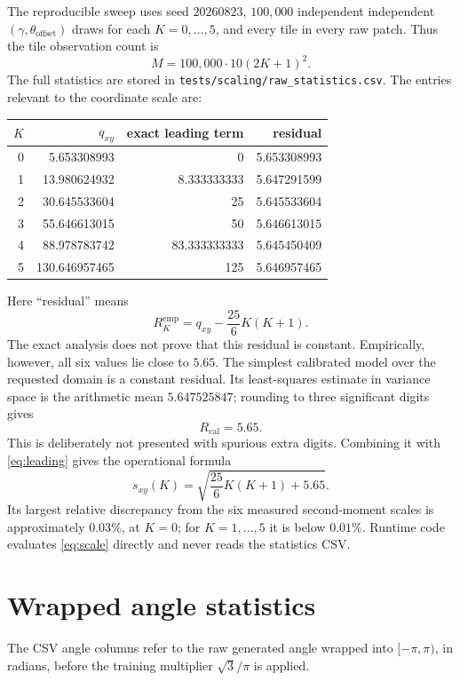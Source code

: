 \documentclass[11pt]{article}
\begin{document}
The reproducible sweep uses seed \(20260823\), \(100{,}000\) independent
independent \((\gamma,\theta_{\mathrm{offset}})\) draws for each
\(K=0,\ldots,5\), and every tile in every raw
patch.
Thus the tile observation count is
\[
  M=100{,}000\cdot10(2K+1)^2.
\]
The full statistics are stored in
\texttt{tests/scaling/raw\_statistics.csv}.  The entries relevant to the
coordinate scale are:
\begin{center}
\begin{tabular}{rrrr}
\(K\)&\(q_{xy}\)&exact leading term&residual\\
\hline
0&5.653308993&0&5.653308993\\
1&13.980624932&8.333333333&5.647291599\\
2&30.645533604&25&5.645533604\\
3&55.646613015&50&5.646613015\\
4&88.978783742&83.333333333&5.645450409\\
5&130.646957465&125&5.646957465
\end{tabular}
\end{center}
Here ``residual'' means
\[
  R_K^{\mathrm{emp}}
  =
  q_{xy}-
  \frac{25}{6}K(K+1).
\]
The exact analysis does not prove that this residual is constant.  Empirically,
however, all six values lie close to \(5.65\).  The simplest calibrated model
over the requested domain is a constant residual.  Its least-squares estimate
in variance space is the arithmetic mean \(5.647525847\); rounding to three
significant digits gives
\[
  R_{\mathrm{cal}}=5.65.
\]
This is deliberately not presented with spurious extra digits.  Combining it
with \eqref{eq:leading} gives the operational formula
\begin{equation}
  \boxed{
  s_{xy}(K)
  =
  \sqrt{\frac{25}{6}K(K+1)+5.65}
  }.
  \label{eq:scale}
\end{equation}
Its largest relative discrepancy from the six measured second-moment scales
is approximately \(0.03\%\), at \(K=0\); for
\(K=1,\ldots,5\) it is below \(0.01\%\).  Runtime code evaluates
\eqref{eq:scale} directly and never reads the statistics CSV.

\section{Wrapped angle statistics}

The CSV angle columns refer to the raw generated angle wrapped into
\([-\pi,\pi)\), in radians, before the training multiplier
\(\sqrt3/\pi\) is applied.
\end{document}

